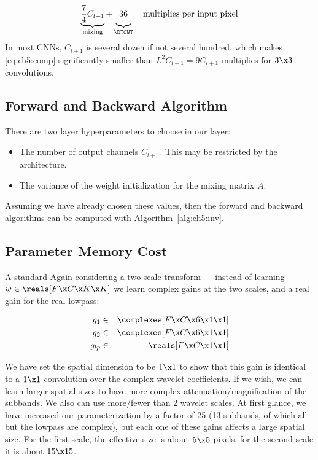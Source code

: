 \begin{equation}
  \underbrace{ \frac{7}{4}C_{l+1} }_{\textrm{mixing}} +
  \underbrace{\vphantom{\frac{7}{4}} 36}_{\DTCWT} \quad
  \textrm{multiplies per input pixel}\label{eq:ch5:comp}
\end{equation}
In most CNNs, $C_{l+1}$ is several dozen if not several
hundred, which makes \eqref{eq:ch5:comp} significantly smaller than
$L^2C_{l+1}=9C_{l+1}$ multiplies for $3\x 3$ convolutions.

\subsection{Forward and Backward Algorithm}
There are two layer hyperparameters to choose in our layer:
\begin{itemize}
  \item The number of output channels $C_{l+1}$. This may be restricted by the
    architecture.
  \item The variance of the weight initialization for the mixing matrix $A$.
\end{itemize}

Assuming we have already chosen these values, 
then the forward and backward algorithms can be computed with
Algorithm~\autoref{alg:ch5:inv}.


\subsection{Parameter Memory Cost}
A standard 
Again considering a two scale transform --- instead of learning $w\in \reals[F
\x C\x K\x K]$ we learn complex gains at the two scales, and a real gain for the
real lowpass:

\begin{eqnarray*}
  g_1 &\in& \complexes[F\x C\x 6\x 1\x 1] \\
  g_2 &\in& \complexes[F\x C\x 6\x 1\x 1] \\
  g_{lp} &\in& \reals[F\x C\x 1\x 1]
\end{eqnarray*}

We have set the spatial dimension to be $1\x 1$ to show that this gain is
identical to a $1\x 1$ convolution over the complex wavelet coefficients. If we
wish, we can learn larger spatial sizes to have more complex
attenuation/magnification of the subbands. We also can use more/fewer than
2 wavelet scales.  At first glance, we have increased our parameterization by
a factor of 25 (13 subbands, of which all but the lowpass are complex), but
each one of these gains affects a large spatial size. For the first scale, the
effective size is about $5\x 5$ pixels, for the second scale it is about $15\x
15$.

